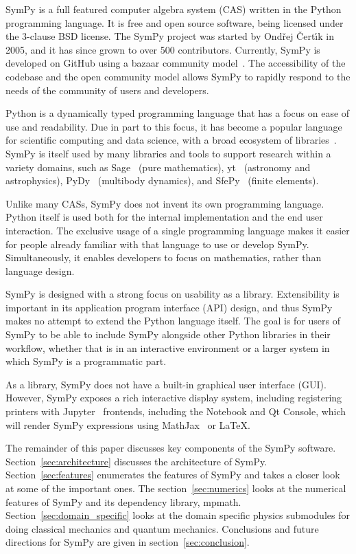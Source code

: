 SymPy is a full featured computer algebra system (CAS) written in the Python
programming language.
It is free and open source software, being licensed under the 3-clause BSD
license.
The SymPy project was started by Ond\v{r}ej \v{C}ert\'{\i}k in 2005, and it has
since grown to over 500 contributors. Currently, SymPy is
developed on GitHub using a bazaar community
model~\cite{raymond1999cathedral}. The accessibility of the codebase and the
open community model allows SymPy to rapidly respond to the needs of the
community of users and developers.

Python is a dynamically typed programming language that has a focus on
ease of use and readability. Due in part to this focus, it has become a popular
language for scientific
computing and data science, with a broad ecosystem of
libraries~\cite{oliphant2007python}. SymPy is itself used by many libraries
and tools to support research within a variety  domains, such as
Sage~\cite{SAGE} (pure mathematics),
yt~\cite{2011ApJS..192....9T} (astronomy and astrophysics),
PyDy~\cite{gede2013constrained} (multibody dynamics), and
SfePy~\cite{cimrman2014sfepy} (finite elements).

Unlike many CASs, SymPy does not invent its own programming language. Python
itself is used both for the internal implementation and the end user
interaction.  The exclusive usage of a single programming language makes it easier
for people already familiar with that language to use or develop SymPy.
Simultaneously, it enables developers to focus on mathematics, rather than
language design.

SymPy is designed with a strong focus on usability as a library.
Extensibility is important in its application program interface
(API) design, and thus SymPy makes no attempt to extend
the Python language itself. The goal is for users of SymPy to be able to
include SymPy alongside other Python libraries in their workflow, whether that
is in an interactive environment or a larger system in which SymPy is a
programmatic part.

As a library, SymPy does not have a built-in graphical user
interface (GUI). However, SymPy exposes a rich interactive display system,
including registering printers with Jupyter~\cite{perez2007ipython} frontends,
including the Notebook and Qt Console, which will render SymPy
expressions using MathJax~\cite{cervone2012mathjax} or \LaTeX{}.

The remainder of this paper discusses key components of the SymPy software.
Section~\ref{sec:architecture} discusses the architecture of SymPy.
Section~\ref{sec:features} enumerates the features of SymPy and takes a closer
look at some of the important ones. The section~\ref{sec:numerics}
looks at the numerical features of SymPy and its dependency library, mpmath.
Section~\ref{sec:domain_specific} looks at the domain specific physics
submodules for doing classical mechanics and quantum mechanics. Conclusions and future directions for SymPy are given in section~\ref{sec:conclusion}.

